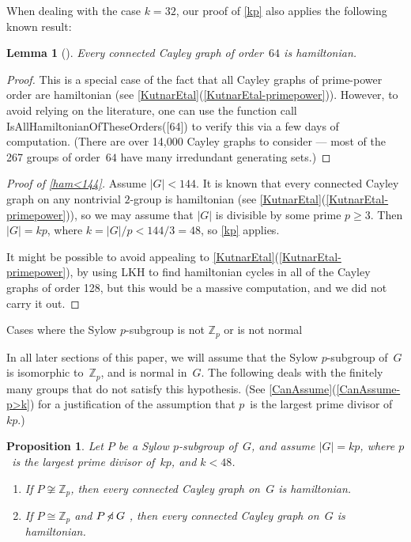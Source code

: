 \documentclass[]{amcjoucc}
\makeatletter
\newcommand{\fullcsee}[2]{\textup(see \fullcref{#1}{#2}\textup)}
\newcommand{\pref}[1]{(\ref{#1})}
\newcommand{\fullcref}[2]{\cref{#1}\pref{#1-#2}}
\theoremstyle{plain}
\newtheorem{prop}[equation]{Proposition}
\newtheorem{lem}[equation]{Lemma}
\theoremstyle{definition}
\theoremstyle{definition}
\newenvironment{justification}{\begingroup \renewcommand{\proofname}{Justification}\begin{proof}}{\end{proof}\endgroup}
\newcommand{\iso}{\cong}
\newcommand{\ZZ}{\mathbb{Z}}
\newcommand{\normal}{\triangleleft}
\newcommand{\notnormal}{\mathrel{\mkern-3mu\not\mkern-3mu\normal}}
\newcommand{\function}[1]{\textsf{#1}}
\renewcommand{\subsection}{%
\@startsection{subsection}{2}{0pt}{-\baselineskip}{0.5\baselineskip}{\mathversion{bold}\bfseries}%
}
\makeatother
\begin{document}
When dealing with the case $k = 32$, our proof of \cref{kp} also applies the following known result:

\begin{lem}[\cite{Witte-PrimePower}] \label{ham64}
Every connected Cayley graph of order~$64$ is hamiltonian.
\end{lem}

\begin{justification}
This is a special case of the fact that all Cayley graphs of prime-power order are hamiltonian \fullcsee{KutnarEtal}{primepower}. However, to avoid relying on the literature, one can use the function call
	\function{IsAllHamiltonianOfTheseOrders([64])}
to verify this via a few days of computation. (There are over 14,000 Cayley graphs to consider --- most of the 267 groups of order~$64$ have many irredundant generating sets.)
\end{justification}

\begin{proof}[Proof of \cref{ham<144}]
Assume $|G| < 144$. It is known that every connected Cayley graph on any nontrivial $2$-group is hamiltonian \fullcsee{KutnarEtal}{primepower}, so we may assume that $|G|$ is divisible by some prime $p \ge 3$. Then $|G| = kp$, where $k = |G|/p < 144/3 = 48$, so \cref{kp} applies.

It might be possible to avoid appealing to \fullcref{KutnarEtal}{primepower}, by using \function{LKH} to find hamiltonian cycles in all of the Cayley graphs of order 128, but this would be a massive computation, and we did not carry it out.
\end{proof}

\subsection{\texorpdfstring{Cases where the Sylow $p$-subgroup is not $\ZZ_p$ or is not normal}%
	{Cases where the Sylow p-subgroup is not Zp or is not normal}} \label{anomalousSect}

In all later sections of this paper, we will assume that the Sylow $p$-subgroup of~$G$ is isomorphic to~$\ZZ_p$, and is normal in~$G$. The following  deals with the finitely many groups that do not satisfy this hypothesis.
(See \fullcref{CanAssume}{p>k} for a justification of the assumption that $p$~is the largest prime divisor of~$kp$.)

\begin{prop} \label{anomalous}
Let $P$ be a Sylow $p$-subgroup of~$G$, and assume $|G| = kp$, where $p$~is the largest prime divisor of~$kp$, and $k < 48$.
	\begin{enumerate}
	
	\item \label{anomalous-notZp}
	If $P \not\iso \ZZ_p$, then every connected Cayley graph on~$G$ is hamiltonian.
	
	\item \label{anomalous-notnormal}
	If $P \iso \ZZ_p$ and $P \notnormal G$ , then every connected Cayley graph on~$G$ is hamiltonian.
	\end{enumerate}
\end{prop}
\end{document}
